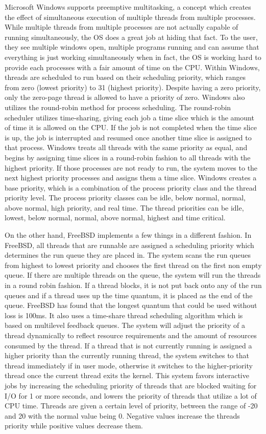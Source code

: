 \documentclass[letterpaper,10pt,draftclsnofoot,onecolumn,titlepage]{IEEEtran}
\begin{document}
		Microsoft Windows supports preemptive multitasking, a concept which creates the effect of simultaneous execution of multiple threads from multiple processes. While multiple threads from multiple processes are not actually capable of running simultaneously, the OS does a great job at hiding that fact. To the user, they see multiple windows open, multiple programs running and can assume that everything is just working simultaneously when in fact, the OS is working hard to provide each processes with a fair amount of time on the CPU. Within Windows, threads are scheduled to run based on their scheduling priority, which ranges from zero (lowest priority) to 31 (highest priority). Despite having a zero priority, only the zero-page thread is allowed to have a priority of zero. Windows also utilizes the round-robin method for process scheduling. The round-robin scheduler utilizes time-sharing, giving each job a time slice which is the amount of time it is allowed on the CPU. If the job is not completed when the time slice is up, the job is interrupted and resumed once another time slice is assigned to that process. Windows treats all threads with the same priority as equal, and begins by assigning time slices in a round-robin fashion to all threads with the highest priority. If those processes are not ready to run, the system moves to the next highest priority processes and assigns them a time slice. Windows creates a base priority, which is a combination of the process priority class and the thread priority level. The process priority classes can be idle, below normal, normal, above normal, high priority, and real time. The thread priorities can be idle, lowest, below normal, normal, above normal, highest and time critical.
		\par
		On the other hand, FreeBSD implements a few things in a different fashion. In FreeBSD, all threads that are runnable are assigned a scheduling priority which determines the run queue they are placed in. The system scans the run queues from highest to lowest priority and chooses the first thread on the first non empty queue. If there are multiple threads on the queue, the system will run the threads in a round robin fashion. If a thread blocks, it is not put back onto any of the run queues and if a thread uses up the time quantum, it is placed as the end of the queue. FreeBSD has found that the longest quantum that could be used without loss is 100ms. It also uses a time-share thread scheduling algorithm which is based on multilevel feedback queues. The system will adjust the priority of a thread dynamically to reflect resource requirements and the amount of resources consumed by the thread. If a thread that is not currently running is assigned a higher priority than the currently running thread, the system switches to that thread immediately if in user mode, otherwise it switches to the higher-priority thread once the current thread exits the kernel. This system favors interactive jobs by increasing the scheduling priority of threads that are blocked waiting for I/O for 1 or more seconds, and lowers the priority of threads that utilize a lot of CPU time. Threads are given a certain level of priority, between the range of {-20} and 20 with the normal value being 0. Negative values increase the threads priority while positive values decrease them.
\end{document}
